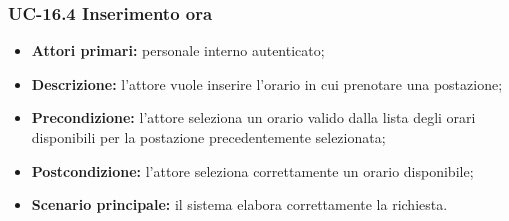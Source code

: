 \subsubsection{UC-16.4 Inserimento ora}

\begin{itemize}
\item \textbf{Attori primari:} personale interno autenticato;
\item \textbf{Descrizione:} l'attore vuole inserire l'orario in cui prenotare una postazione;
\item \textbf{Precondizione:} l'attore seleziona un orario valido dalla lista degli orari disponibili per la postazione precedentemente selezionata;
\item \textbf{Postcondizione:} l'attore seleziona correttamente un orario disponibile;
\item \textbf{Scenario principale:} il sistema elabora correttamente la richiesta.
\end{itemize}


